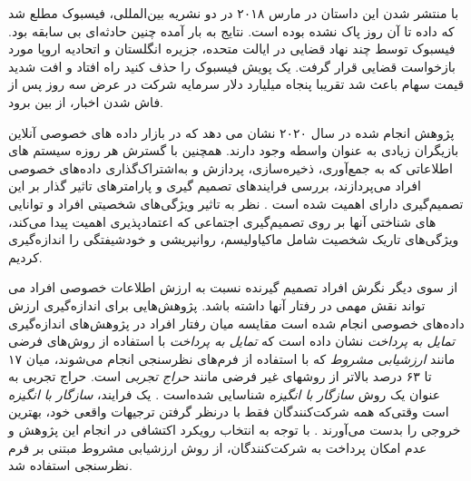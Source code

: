 با منتشر شدن این داستان در مارس ۲۰۱۸ در دو نشریه بین‌المللی، فیسبوک
مطلع شد که داده تا آن روز پاک نشده بوده است. نتایج به بار آمده
چنین حادثه‌ای بی سابقه بود. فیسبوک توسط چند نهاد قضایی در ایالت متحده،
جزیره انگلستان و اتحادیه اروپا مورد بازخواست قضایی قرار گرفت. یک پویش
فیسبوک را حذف کنید راه افتاد و افت شدید قیمت سهام باعث شد تقریبا پنجاه میلیارد دلار
سرمایه شرکت در عرض سه روز پس از فاش شدن اخبار، از بین برود.

پژوهش انجام شده در سال ۲۰۲۰ نشان می دهد که در بازار داده های خصوصی آنلاین بازیگران زیادی به عنوان واسطه وجود دارند.
\!\citep{agogoInvisibleMarketOnline2021}
همچنین با گسترش هر روزه سیستم های اطلاعاتی که به
جمع‌آوری، ذخیره‌سازی، پردازش و به‌اشتراک‌گذاری داده‌های
خصوصی افراد می‌پردازند، بررسی فرایندهای
تصمیم گیری و پارامتر‌های تاثیر گذار
بر این تصمیم‌گیری دارای اهمیت شده است
\!\citep{spiekermannValuesEthicsInformation2022}.
نظر به تاثیر ویژگی‌های شخصیتی افراد و توانایی های شناختی آنها بر روی تصمیم‌گیری اجتماعی که اعتمادپذیری اهمیت پیدا 
می‌کند، ویژگی‌های تاریک شخصیت شامل ماکیاولیسم، روانپریشی و خودشیفتگی را اندازه‌گیری کردیم.

از سوی دیگر نگرش افراد تصمیم گیرنده نسبت به ارزش اطلاعات خصوصی افراد می تواند نقش مهمی در رفتار آنها داشته باشد.
پژوهش‌هایی برای اندازه‌گیری ارزش داده‌های خصوصی انجام شده است
\!\citep{  fastValuePersonalData2021a,wesselsSellNotSell2019,tangHowChineseWeb2021}
\ifWillingnessToPay
  مقایسه میان رفتار افراد در پژوهش‌های اندازه‌گیری
  \textit{تمایل به پرداخت}
  نشان داده است که
  \textit{تمایل به پرداخت }
  با استفاده از روش‌های فرضی مانند
  \textit{ارزشيابی مشروط}
  که با استفاده از فرم‌های نظرسنجی انجام می‌شوند،
  میان ۱۷ تا ۶۳ درصد بالاتر
  از روشهای غیر فرضی مانند
  \textit{حراج تجربی}
  است.
  حراج تجربی به عنوان یک روش
  \textit{سازگار با انگیزه}
  شناسایی شده‌است
  \!\citep{martinez-carrascoComparingHypotheticalNonhypothetical2015}
  .
  یک فرایند،
  \textit{سازگار با انگیزه}
  است وقتی‌که همه شرکت‌کنندگان فقط  با درنظر گرفتن ترجیهات واقعی خود، بهترین خروجی را بدست می‌آورند
  \!\citep{nisanAlgorithmicGameTheory2007}
  \!. 
با توجه به انتخاب رویکرد اکتشافی در انجام این پژوهش و عدم  امکان پرداخت به شرکت‌کنندگان، از روش ارزشیابی مشروط 
مبتنی بر فرم نظرسنجی استفاده شد.

